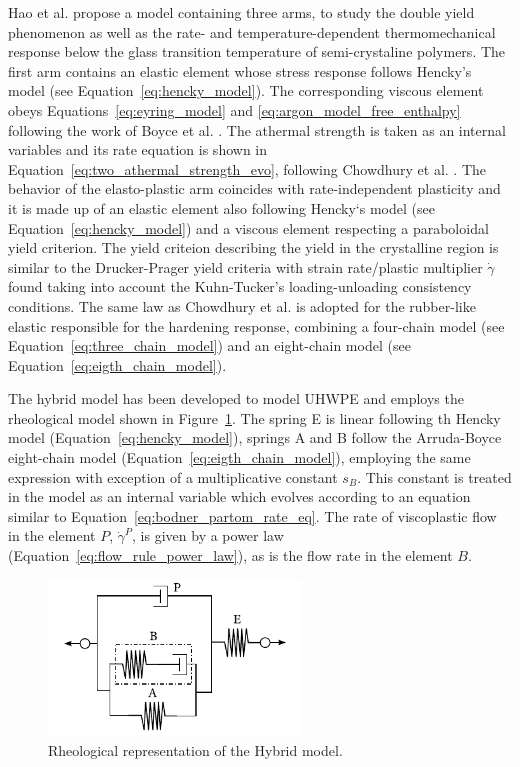 Hao et al. \citep{haoRatedependentConstitutiveModel2022} propose a model containing three arms, to study the double yield phenomenon as well as the rate- and temperature-dependent thermomechanical response below the glass transition temperature of semi-crystaline polymers.
The first arm contains an elastic element whose stress response follows Hencky's model (see Equation~\eqref{eq:hencky_model}).
The corresponding viscous element obeys Equations~\eqref{eq:eyring_model} and \eqref{eq:argon_model_free_enthalpy} following the work of Boyce et al. \citep{boyceLargeInelasticDeformation1988}.
The athermal strength is taken as an internal variables and its rate equation is shown in Equation~\eqref{eq:two_athermal_strength_evo}, following Chowdhury et al. \citep{chowdhuryEffectsManufacturingInducedVoids2008}.
The behavior of the elasto-plastic arm coincides with rate-independent plasticity and it is made up of an elastic element also following Hencky`s model (see Equation~\eqref{eq:hencky_model}) and a viscous element respecting a paraboloidal yield criterion.
The yield criteion describing the yield in the crystalline region is similar to the Drucker-Prager yield criteria with strain rate/plastic multiplier $\dot \gamma$ found taking into account the Kuhn-Tucker's loading-unloading consistency conditions.
The same law as Chowdhury et al. is adopted for the rubber-like elastic responsible for the hardening response, combining a  four-chain model (see Equation~\eqref{eq:three_chain_model}) and an eight-chain model (see Equation~\eqref{eq:eigth_chain_model}).

The hybrid model has been developed to model UHWPE \citep{bergstromConstitutiveModelingUltrahigh2002, bergstromPredictionMultiaxialMechanical2003} and employs the rheological model shown in Figure~\ref{fig:hybrid_model}.
The spring E is linear following th Hencky model (Equation~\eqref{eq:hencky_model}), springs A and B follow the Arruda-Boyce eight-chain model (Equation~\eqref{eq:eigth_chain_model}), employing the same expression with exception of a multiplicative constant $s_B$.
This constant is treated in the model as an internal variable which evolves according to an equation similar to Equation~\eqref{eq:bodner_partom_rate_eq}.
The rate of viscoplastic flow in the element $P$, $\dot\gamma^P$, is given by a power law (Equation~\eqref{eq:flow_rule_power_law}), as is the flow rate in the element $B$.
\begin{figure}[hbtp]
	\includegraphics[width=0.6\textwidth]{figures/hybrid_model}
	\caption{Rheological representation of the Hybrid model.}
\label{fig:hybrid_model}
\end{figure}

